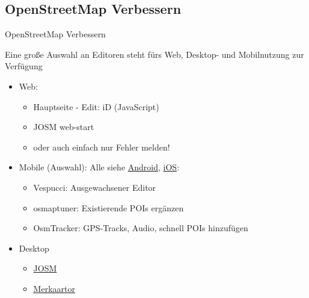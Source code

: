 \documentclass{beamer}
\begin{document}
  \subsection{ OpenStreetMap Verbessern}

\begin{frame}{OpenStreetMap Verbessern}

  Eine große Auswahl an Editoren steht fürs Web, Desktop- und Mobilnutzung zur Verfügung

  \begin{itemize}
    \item Web:
    \begin{itemize}
	    \item Hauptseite - Edit: iD (JavaScript)
      \item JOSM web-start
      \item oder auch einfach nur Fehler melden!
	      \pause
    \end{itemize}
    \item Mobile (Auswahl): Alle siehe  \href{http://wiki.openstreetmap.org/wiki/Android\#OpenStreetMap\_editing\_features}{Android}, \href{http://wiki.openstreetmap.org/wiki/Apple\_iOS\#OpenStreetMap\_editing\_features}{iOS}:
    \begin{itemize}
      \item Vespucci: Ausgewachsener Editor
      \item osmaptuner: Existierende POIs ergänzen
      \item OsmTracker: GPS-Tracks, Audio, schnell POIs hinzufügen
    \end{itemize}
  \item Desktop
    \begin{itemize}
      \item \href{http://josm.openstreetmap.de}{JOSM}
      \item \href{http://merkaartor.be}{Merkaartor}
    \end{itemize}
  \end{itemize}

\end{frame}
\end{document}

